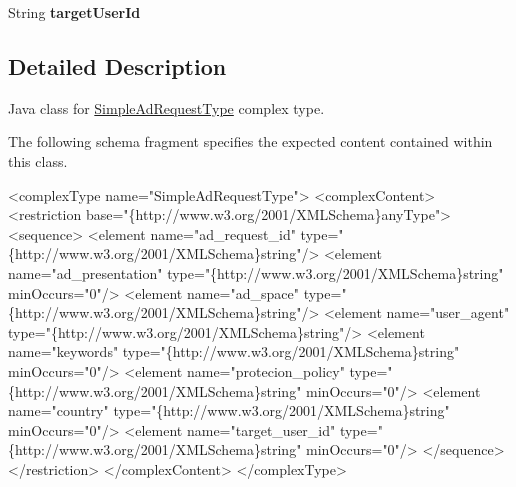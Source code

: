 \begin{DoxyCompactItemize}
\item 
\hypertarget{classcom_1_1telefonica_1_1schemas_1_1unica_1_1rest_1_1sgap_1_1v1_1_1SimpleAdRequestType_a9cc2a101f4bed4228b5a4ed6cfdd3889}{
String {\bfseries targetUserId}}
\label{classcom_1_1telefonica_1_1schemas_1_1unica_1_1rest_1_1sgap_1_1v1_1_1SimpleAdRequestType_a9cc2a101f4bed4228b5a4ed6cfdd3889}

\end{DoxyCompactItemize}


\subsection{Detailed Description}
Java class for \hyperlink{classcom_1_1telefonica_1_1schemas_1_1unica_1_1rest_1_1sgap_1_1v1_1_1SimpleAdRequestType}{SimpleAdRequestType} complex type.

The following schema fragment specifies the expected content contained within this class.


\begin{DoxyPre}
 <complexType name="SimpleAdRequestType">
   <complexContent>
     <restriction base="\{http://www.w3.org/2001/XMLSchema\}anyType">
       <sequence>
         <element name="ad\_request\_id" type="\{http://www.w3.org/2001/XMLSchema\}string"/>
         <element name="ad\_presentation" type="\{http://www.w3.org/2001/XMLSchema\}string" minOccurs="0"/>
         <element name="ad\_space" type="\{http://www.w3.org/2001/XMLSchema\}string"/>
         <element name="user\_agent" type="\{http://www.w3.org/2001/XMLSchema\}string"/>
         <element name="keywords" type="\{http://www.w3.org/2001/XMLSchema\}string" minOccurs="0"/>
         <element name="protecion\_policy" type="\{http://www.w3.org/2001/XMLSchema\}string" minOccurs="0"/>
         <element name="country" type="\{http://www.w3.org/2001/XMLSchema\}string" minOccurs="0"/>
         <element name="target\_user\_id" type="\{http://www.w3.org/2001/XMLSchema\}string" minOccurs="0"/>
       </sequence>
     </restriction>
   </complexContent>
 </complexType>
 \end{DoxyPre}
 

